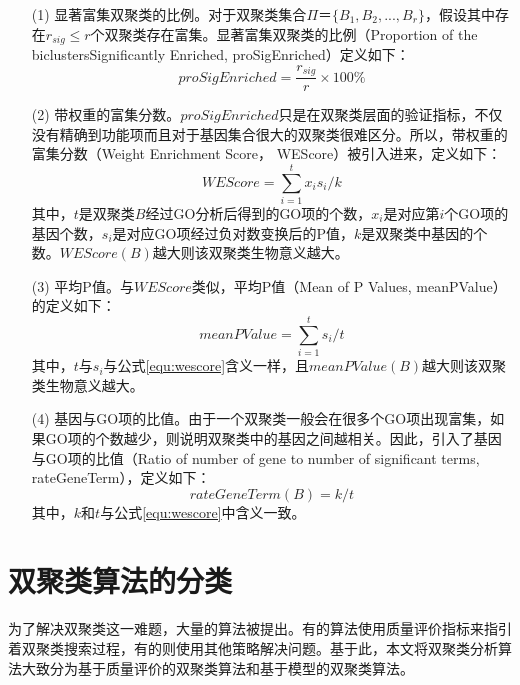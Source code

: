   \begin{enumerate}
    \item[(1)] 显著富集双聚类的比例。对于双聚类集合$\Pi＝\{B_1,B_2,...,B_r\}$，假设其中存在$r_{sig} \le r$个双聚类存在富集。显著富集双聚类的比例（Proportion of the biclustersSignificantly Enriched, proSigEnriched）定义如下：
    \begin{equation}
      proSigEnriched = \frac{r_{sig}}{r} \times 100\%
    \end{equation}

    \item[(2)] 带权重的富集分数。$proSigEnriched$只是在双聚类层面的验证指标，不仅没有精确到功能项而且对于基因集合很大的双聚类很难区分。所以，带权重的富集分数（Weight Enrichment Score， WEScore）被引入进来，定义如下：
    \begin{equation}\label{equ:wescore}
      WEScore = \sum_{i=1}^t{x_i s_i}/k
    \end{equation}
    \hspace{2em}其中，$t$是双聚类$B$经过GO分析后得到的GO项的个数，$x_i$是对应第$i$个GO项的基因个数，$s_i$是对应GO项经过负对数变换后的P值，$k$是双聚类中基因的个数。$WEScore(B)$越大则该双聚类生物意义越大。

    \item[(3)] 平均P值。与$WEScore$类似，平均P值（Mean of P Values, meanPValue）的定义如下：
    \begin{equation}\label{equ:meanP}
      meanPValue = \sum_{i=1}^ts_i/t
    \end{equation}
    \hspace{2em}其中，$t$与$s_i$与公式\ref{equ:wescore}含义一样，且$meanPValue(B)$越大则该双聚类生物意义越大。

    \item[(4)] 基因与GO项的比值。由于一个双聚类一般会在很多个GO项出现富集，如果GO项的个数越少，则说明双聚类中的基因之间越相关。因此，引入了基因与GO项的比值（Ratio of number of gene to number of significant terms, rateGeneTerm），定义如下：
    \begin{equation}
     rateGeneTerm(B) = k / t 
    \end{equation}
    \hspace{2em}其中，$k$和$t$与公式\ref{equ:wescore}中含义一致。
  \end{enumerate}

\section{双聚类算法的分类}
为了解决双聚类这一难题，大量的算法被提出。有的算法使用质量评价指标来指引着双聚类搜索过程，有的则使用其他策略解决问题。基于此，本文将双聚类分析算法大致分为基于质量评价的双聚类算法和基于模型的双聚类算法。

